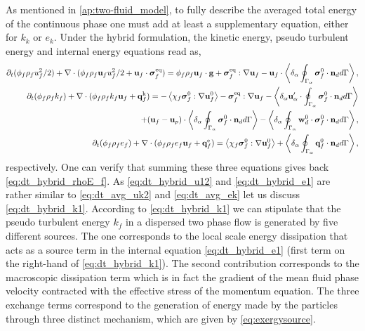 As mentioned in \ref{ap:two-fluid_model}, to fully describe the averaged total energy of the continuous phase one must add at least a supplementary equation, either for $k_k$ or $e_k$.  
Under the hybrid formulation, the kinetic energy, pseudo turbulent energy and internal energy equations read as,
\begin{align}
    \partial_t (\phi_f \rho_fu_f^2/2)  
    + \mathbf{\nabla}\cdot (
        \phi_f \rho_f\textbf{u}_fu_f^2/2
        + \textbf{u}_f \cdot \bm{\sigma}_f^\text{eq}
    )
    = 
    \phi_f \rho_f \textbf{u}_f\cdot \textbf{g} 
    + \bm{\sigma}_f^\text{eq} : \mathbf{\nabla} \textbf{u}_f
    -  \textbf{u}_f\cdot 
        \left<\delta_\alpha \oint_{\Gamma_{\alpha}} {\bm{\sigma}_f^0 \cdot \textbf{n}_d} d\Gamma\right>,
        \label{eq:dt_hybrid_u12}
        \\
    \label{eq:dt_hybrid_k1}
    \partial_t (\phi_f\rho_fk_f)  
    + \mathbf{\nabla}\cdot (
        \phi_f\rho_fk_f\textbf{u}_f
        + \textbf{q}_f^\text{k} 
        )
    = 
    - \left<\chi_f\bm{\sigma}_f^0 : \mathbf{\nabla} \textbf{u}_f^0\right>
    - \bm{\sigma}_f^\text{eq} : \mathbf{\nabla} \textbf{u}_f\nonumber
    - \left<\delta_\alpha  \textbf{u}_\alpha' \cdot \oint_{\Gamma_{\alpha}}   \bm{\sigma}_f^0 \cdot \textbf{n}_d d\Gamma\right>\\
    + (\textbf{u}_f - \textbf{u}_p)\cdot \left<\delta_\alpha \oint_{\Gamma_{\alpha}} {\bm{\sigma}_f^0 \cdot \textbf{n}_d} d\Gamma\right> 
    - \left<\delta_\alpha  \oint_{\Gamma_{\alpha}} \textbf{w}_d^0 \cdot \bm{\sigma}_f^0 \cdot \textbf{n}_d d\Gamma\right>,
    \\
    \label{eq:dt_hybrid_e1}
    \partial_t (\phi_f\rho_fe_f)  
    + \mathbf{\nabla}\cdot (
        \phi_f \rho_fe_f\textbf{u}_f
        +
        \textbf{q}_f^\text{e} 
        )
    = 
    \left<\chi_f\bm{\sigma}_f^0 : \mathbf{\nabla} \textbf{u}_f^0\right>
    + \left<\delta_\alpha \oint_{\Gamma_{\alpha}} {\textbf{q}_f^0 \cdot \textbf{n}_d} d\Gamma\right>,
\end{align}
respectively. 
One can verify that summing these three equations gives back \ref{eq:dt_hybrid_rhoE_f}. 
As \ref{eq:dt_hybrid_u12} and \ref{eq:dt_hybrid_e1} are rather similar to \ref{eq:dt_avg_uk2} and \ref{eq:dt_avg_ek} let us discuss \ref{eq:dt_hybrid_k1}. 
According to  \ref{eq:dt_hybrid_k1} we can stipulate that the pseudo turbulent energy $k_f$ in a dispersed two phase flow is generated by five different sources. 
The one corresponds to the local scale energy dissipation that acts as a source term in the internal equation \eqref{eq:dt_hybrid_e1} (first term on the right-hand of \ref{eq:dt_hybrid_k1}). 
The second contribution corresponds to the macroscopic dissipation term which is in fact the gradient of the mean fluid phase velocity contracted with the effective stress of the momentum equation.  
The three exchange terms correspond to the generation of energy made by the particles through three distinct mechanism, which are given by \ref{eq:exergysource}. 
